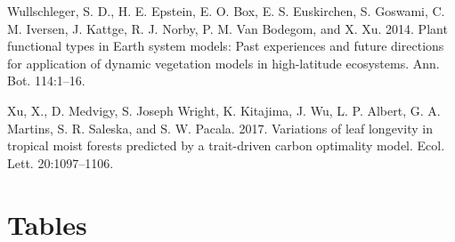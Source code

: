 \documentclass[
  12pt,
]{article}
\newlength{\cslhangindent}
\newenvironment{cslreferences}%
  {\setlength{\parindent}{0pt}%
  \everypar{\setlength{\hangindent}{\cslhangindent}}\ignorespaces}%
  {\par}
\begin{document}
\begin{cslreferences}
\leavevmode\hypertarget{ref-Wullschleger2014}{}%
Wullschleger, S. D., H. E. Epstein, E. O. Box, E. S. Euskirchen, S. Goswami, C. M. Iversen, J. Kattge, R. J. Norby, P. M. Van Bodegom, and X. Xu. 2014. Plant functional types in Earth system models: Past experiences and future directions for application of dynamic vegetation models in high-latitude ecosystems. Ann. Bot. 114:1--16.

\leavevmode\hypertarget{ref-Xu2017}{}%
Xu, X., D. Medvigy, S. Joseph Wright, K. Kitajima, J. Wu, L. P. Albert, G. A. Martins, S. R. Saleska, and S. W. Pacala. 2017. Variations of leaf longevity in tropical moist forests predicted by a trait-driven carbon optimality model. Ecol. Lett. 20:1097--1106.
\end{cslreferences}

\newpage

\hypertarget{tables}{%
\section{Tables}\label{tables}}
\end{document}
